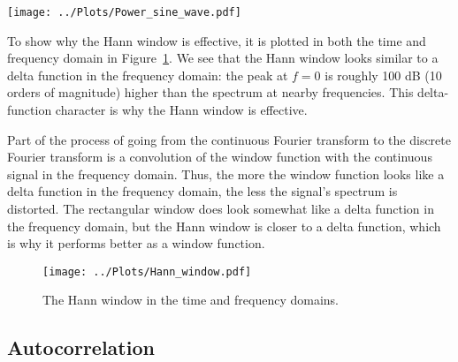 \documentclass[twocolumn]{myarticle}
\begin{document}
\begin{figure*}[htpb]
    \centering
    \texttt{[image: ../Plots/Power\_sine\_wave.pdf]}
    \caption{The power spectrum of a pure sine wave with different frequencies and different window functions.}
    \label{fig:power_sine_wave}
\end{figure*}

To show why the Hann window is effective, it is plotted in both the time and frequency domain in Figure~\ref{fig:hann_window}.
We see that the Hann window looks similar to a delta function in the frequency domain: the peak at $ f = 0 $ is roughly 100 dB (10 orders of magnitude) higher than the spectrum at nearby frequencies.
This delta-function character is why the Hann window is effective.

Part of the process of going from the continuous Fourier transform to the discrete Fourier transform is a convolution of the window function with the continuous signal in the frequency domain.
Thus, the more the window function looks like a delta function in the frequency domain, the less the signal's spectrum is distorted.
The rectangular window does look somewhat like a delta function in the frequency domain, but the Hann window is closer to a delta function, which is why it performs better as a window function.

\begin{figure}[ht]
    \centering
    \texttt{[image: ../Plots/Hann\_window.pdf]}
    \caption{The Hann window in the time and frequency domains.}
    \label{fig:hann_window}
\end{figure}

\subsection{Autocorrelation}
\label{subsec:autocorrelation}
\end{document}
